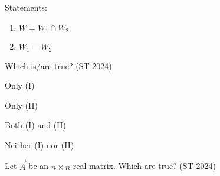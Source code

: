 Statements:  
\begin{enumerate}[label=(\Roman*)]
	\item $W = W_1 \cap W_2$  
	\item  $W_1 = W_2$
\end{enumerate}
Which is/are true?
\hfill (ST 2024)
\begin{enumerate}
\begin{multicols}{4}
\item Only (I)
\item Only (II)
\item Both (I) and (II)
\item Neither (I) nor (II)
\end{multicols}
\end{enumerate}
\item
Let $\vec{A}$ be an $n\times n$ real matrix. Which are true?
\hfill (ST 2024)

